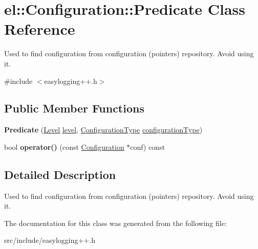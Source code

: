 \hypertarget{classel_1_1_configuration_1_1_predicate}{}\section{el\+:\+:Configuration\+:\+:Predicate Class Reference}
\label{classel_1_1_configuration_1_1_predicate}


Used to find configuration from configuration (pointers) repository. Avoid using it.  




{\ttfamily \#include $<$easylogging++.\+h$>$}

\subsection*{Public Member Functions}
\begin{DoxyCompactItemize}
\item 
\mbox{\label{classel_1_1_configuration_1_1_predicate_ab0a4580d6c2d1aaf36a62913fdc38447}} 
{\bfseries Predicate} (\hyperlink{namespaceel_ab0ac6091262344c52dd2d3ad099e8e36}{Level} \hyperlink{classel_1_1_configuration_a4f7015eb299c0250dadc9eb15be76c31}{level}, \hyperlink{namespaceel_a281f5db6d6163678bc68a8b23b59e124}{Configuration\+Type} \hyperlink{classel_1_1_configuration_abd69269de9fa62e0052aeaca35814dc0}{configuration\+Type})
\item 
\mbox{\label{classel_1_1_configuration_1_1_predicate_a961e7b14fc7541eefb04cbdcbc074e6e}} 
bool {\bfseries operator()} (const \hyperlink{classel_1_1_configuration}{Configuration} $\ast$conf) const
\end{DoxyCompactItemize}


\subsection{Detailed Description}
Used to find configuration from configuration (pointers) repository. Avoid using it. 

The documentation for this class was generated from the following file\+:\begin{DoxyCompactItemize}
\item 
src/include/easylogging++.\+h\end{DoxyCompactItemize}
